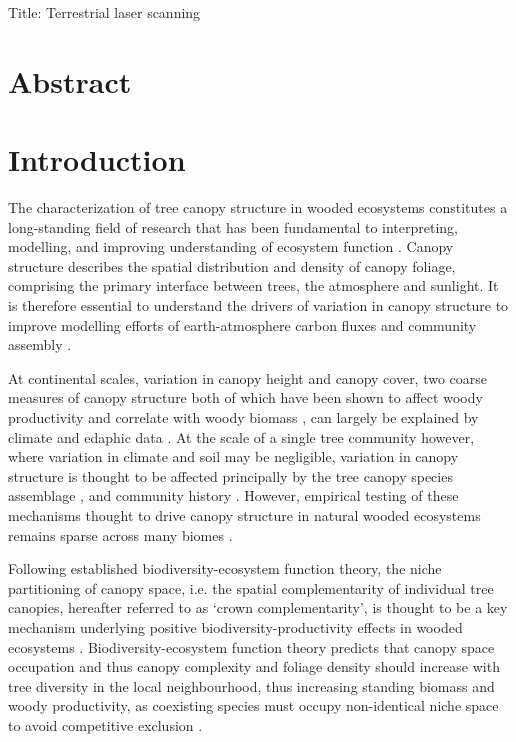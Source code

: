 \documentclass[11pt,a4paper]{article}
\newcommand{\titletext}{Terrestrial laser scanning}
\begin{document}
{\Large{Title: \titletext{}}}

\linenumbers

\section*{Abstract}

\section{Introduction}

The characterization of tree canopy structure in wooded ecosystems constitutes a long-standing field of research that has been fundamental to interpreting, modelling, and improving understanding of ecosystem function \citep{Watt1947, Whittaker1969, Horn1971, Maarel1996}. Canopy structure describes the spatial distribution and density of canopy foliage, comprising the primary interface between trees, the atmosphere and sunlight. It is therefore essential to understand the drivers of variation in canopy structure to improve modelling efforts of earth-atmosphere carbon fluxes and community assembly \citep{}. 

At continental scales, variation in canopy height and canopy cover, two coarse measures of canopy structure both of which have been shown to affect woody productivity and correlate with woody biomass \citep{}, can largely be explained by climate and edaphic data \citep{SOME-GEDI}. At the scale of a single tree community however, where variation in climate and soil may be negligible, variation in canopy structure is thought to be affected principally by the tree canopy species assemblage \citep{}, and community history \citep{}. However, empirical testing of these mechanisms thought to drive canopy structure in natural wooded ecosystems remains sparse across many biomes \citep{}.

Following established biodiversity-ecosystem function theory, the niche partitioning of canopy space, i.e. the spatial complementarity of individual tree canopies, hereafter referred to as `crown complementarity', is thought to be a key mechanism underlying positive biodiversity-productivity effects in wooded ecosystems \citep{Pretzsch2014, Barry2019}. Biodiversity-ecosystem function theory predicts that canopy space occupation and thus canopy complexity and foliage density should increase with tree diversity in the local neighbourhood, thus increasing standing biomass and woody productivity, as coexisting species must occupy non-identical niche space to avoid competitive exclusion \citep{}. 
\end{document}
